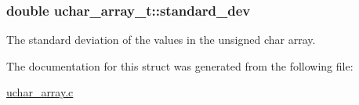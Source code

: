 \subsubsection[{\texorpdfstring{standard\+\_\+dev}{standard_dev}}]{\setlength{\rightskip}{0pt plus 5cm}double uchar\+\_\+array\+\_\+t\+::standard\+\_\+dev}\hypertarget{structuchar__array__t_a6debbe8b5be99042683abaae9961c91d}{}\label{structuchar__array__t_a6debbe8b5be99042683abaae9961c91d}
The standard deviation of the values in the unsigned char array. 

The documentation for this struct was generated from the following file\+:\begin{DoxyCompactItemize}
\item 
\hyperlink{uchar__array_8c}{uchar\+\_\+array.\+c}\end{DoxyCompactItemize}
